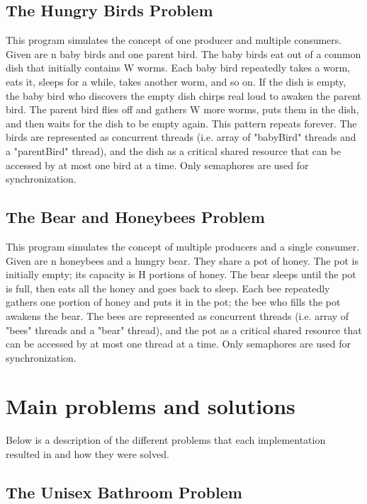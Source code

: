 \documentclass{article}
\begin{document}
\subsection{The Hungry Birds Problem}

This program simulates the concept of one producer and multiple consumers. Given are n baby birds and one parent bird. The baby birds eat out of a common dish that initially contains W worms. Each baby bird repeatedly takes a worm, eats it, sleeps for a while, takes another worm, and so on. If the dish is empty, the baby bird who discovers the empty dish chirps real loud to awaken the parent bird. The parent bird flies off and gathers W more worms, puts them in the dish, and then waits for the dish to be empty again. This pattern repeats forever. The birds are represented as concurrent threads (i.e. array of "babyBird" threads and a "parentBird" thread), and the dish as a critical shared resource that can be accessed by at most one bird at a time. Only semaphores are used for synchronization.

\subsection{The Bear and Honeybees Problem}

This program simulates the concept of multiple producers and a single consumer. Given are n honeybees and a hungry bear. They share a pot of honey. The pot is initially empty; its capacity is H portions of honey. The bear sleeps until the pot is full, then eats all the honey and goes back to sleep. Each bee repeatedly gathers one portion of honey and puts it in the pot; the bee who fills the pot awakens the bear. The bees are represented as concurrent threads (i.e. array of "bees" threads and a "bear" thread), and the pot as a critical shared resource that can be accessed by at most one thread at a time. Only semaphores are used for synchronization.

\section{Main problems and solutions}

Below is a description of the different problems that each implementation resulted in and how they were solved. 

\subsection{The Unisex Bathroom Problem}
\end{document}

